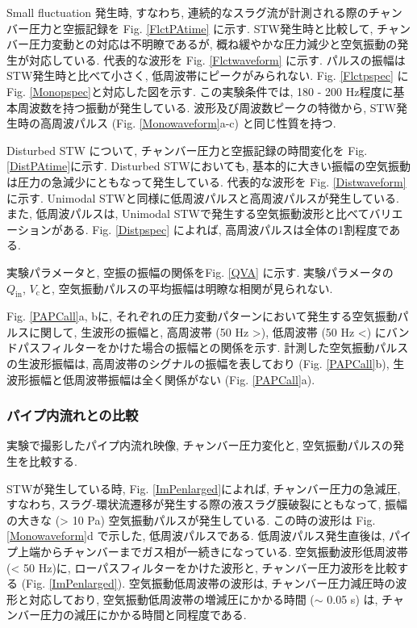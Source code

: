 \documentclass[12pt]{article}
\begin{document}
Small fluctuation 発生時, すなわち, 連続的なスラグ流が計測される際のチャンバー圧力と空振記録を Fig. \ref{FlctPAtime} に示す.  STW発生時と比較して, チャンバー圧力変動との対応は不明瞭であるが, 概ね緩やかな圧力減少と空気振動の発生が対応している. 代表的な波形を Fig. \ref{Flctwaveform} に示す. パルスの振幅はSTW発生時と比べて小さく, 低周波帯にピークがみられない. Fig. \ref{Flctpspec} に Fig. \ref{Monopspec}と対応した図を示す. この実験条件では, 180 - 200 Hz程度に基本周波数を持つ振動が発生している. 波形及び周波数ピークの特徴から, STW発生時の高周波パルス (Fig. \ref{Monowaveform}a-c) と同じ性質を持つ. 

Disturbed STW について, チャンバー圧力と空振記録の時間変化を Fig. \ref{DistPAtime}に示す. Disturbed STWにおいても, 基本的に大きい振幅の空気振動は圧力の急減少にともなって発生している. 代表的な波形を Fig. \ref{Distwaveform} に示す. Unimodal STWと同様に低周波パルスと高周波パルスが発生している. また, 低周波パルスは, Unimodal STWで発生する空気振動波形と比べてバリエーションがある. Fig. \ref{Distpspec} によれば, 高周波パルスは全体の1割程度である. 


実験パラメータと, 空振の振幅の関係をFig. \ref{QVA} に示す. 実験パラメータの $Q_\mathrm{in}$, $V_\mathrm{c}$と, 空気振動パルスの平均振幅は明瞭な相関が見られない. 

Fig. \ref{PAPCall}a, bに, それぞれの圧力変動パターンにおいて発生する空気振動パルスに関して, 生波形の振幅と, 高周波帯 (50 Hz >), 低周波帯 (50 Hz <) にバンドパスフィルターをかけた場合の振幅との関係を示す. 計測した空気振動パルスの生波形振幅は, 高周波帯のシグナルの振幅を表しており (Fig. \ref{PAPCall}b), 生波形振幅と低周波帯振幅は全く関係がない (Fig. \ref{PAPCall}a). 





\clearpage
\subsubsection{パイプ内流れとの比較}
実験で撮影したパイプ内流れ映像, チャンバー圧力変化と, 空気振動パルスの発生を比較する.

STWが発生している時, Fig. \ref{ImPenlarged}によれば, チャンバー圧力の急減圧, すなわち, スラグ-環状流遷移が発生する際の液スラグ膜破裂にともなって, 振幅の大きな (> 10 Pa) 空気振動パルスが発生している. 
この時の波形は Fig. \ref{Monowaveform}d で示した, 低周波パルスである. 低周波パルス発生直後は, パイプ上端からチャンバーまでガス相が一続きになっている.
空気振動波形低周波帯 (< 50 Hz)に, ローパスフィルターをかけた波形と, チャンバー圧力波形を比較する (Fig. \ref{ImPenlarged}). 空気振動低周波帯の波形は, チャンバー圧力減圧時の波形と対応しており, 空気振動低周波帯の増減圧にかかる時間 ($\sim$ 0.05 s) は, チャンバー圧力の減圧にかかる時間と同程度である.
\end{document}
